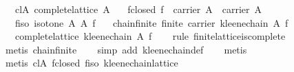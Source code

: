 \begin{isabellebody}
\ \ \ cl{}A{}\ {}complete{}lattice\ A{}\isanewline
\ \ \ f{}closed{}\ {}f\ {}\ carrier\ A\ {}\ carrier\ A{}\isanewline
\ \ \ f{}iso{}\ {}isotone\ A\ A\ f{}\isanewline
\ \ \ chain{}finite{}\ {}finite\ {}carrier\ {}kleene{}chain\ A\ f{}{}{}\isanewline
\ \ \ {}complete{}lattice\ {}kleene{}chain\ A\ f{}{}\isanewline
%
\isadelimproof
\ \ %
\endisadelimproof
%
\isatagproof
{}\isamarkupfalse%
\ {}rule\ finite{}lattice{}is{}complete{}\isanewline
\ \ \isamarkupfalse%
\ {}metis\ chain{}finite{}\isanewline
\ \ \isamarkupfalse%
\ {}simp\ add{}\ kleene{}chain{}def{}\isanewline
\ \ \isamarkupfalse%
\ metis\isanewline
\ \ \isamarkupfalse%
\ {}metis\ cl{}A\ f{}closed\ f{}iso\ kleene{}chain{}lattice{}%

\end{isabellebody}
